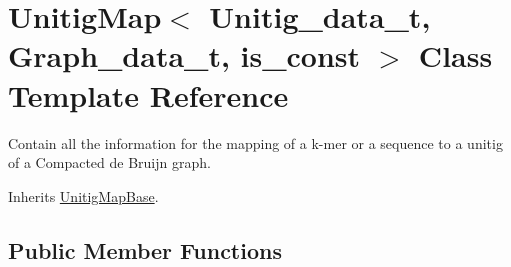 \hypertarget{classUnitigMap}{}\section{Unitig\+Map$<$ Unitig\+\_\+data\+\_\+t, Graph\+\_\+data\+\_\+t, is\+\_\+const $>$ Class Template Reference}
\label{classUnitigMap}


Contain all the information for the mapping of a k-\/mer or a sequence to a unitig of a Compacted de Bruijn graph.  




Inherits \hyperlink{structUnitigMapBase}{Unitig\+Map\+Base}.

\subsection*{Public Member Functions}
